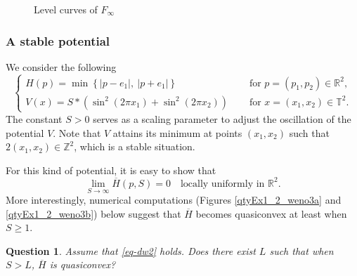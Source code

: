 \documentclass[12pt,reqno]{amsart}
\theoremstyle{plain}
\newtheorem{quest}{Question}
\theoremstyle{remark}
\numberwithin{equation}{section}
\newcommand{\R}{\mathbb{R}}
\newcommand{\T}{\mathbb{T}}
\newcommand{\Z}{\mathbb{Z}}
\newcommand{\ol}{\overline}
\begin{document}
\begin{figure}[h]
\begin{center}
\caption{Level curves of $F_{\infty}$}
\label{fig9}
\end{center}

\end{figure}



\smallskip

\subsubsection{A stable potential} 
We consider the following 
\begin{equation}\label{eq-dw2}
\begin{cases}
H(p)=\min \left\{|p-e_1|, \  |p+e_1|\right\} \quad &\text{ for } p=(p_1,p_2)\in \R^2,\\
V(x)=S * \left(\sin^2 (2\pi x_1)+\sin^2 (2\pi x_2)\right) \quad &\text{ for } x=(x_1,x_2) \in \T^2.
\end{cases}
\end{equation}
The constant $S>0$ serves as a scaling parameter to adjust the  oscillation of the potential $V$.  
 Note that $V$ attains its minimum at points $(x_1,x_2)$ such that $2(x_1,x_2)\in \Z^2$, which is  a stable situation.

For this kind of potential,  it is easy to show that 
$$
\lim_{S\to \infty}\ol H(p,S)=0  \quad \text{locally uniformly in $\R^2$}.
$$
More interestingly,  numerical computations (Figures \ref{qtyEx1_2_weno3a} and \ref{qtyEx1_2_weno3b}) 
below suggest that  $\ol H$ becomes quasiconvex at least when $S\geq 1$. 

\smallskip


\begin{quest} \label{quest2}
Assume that \eqref{eq-dw2} holds.
Does there exist $L$ such that when $S>L$,  $\ol H$ is quasiconvex?  

\end{quest}
\end{document}
